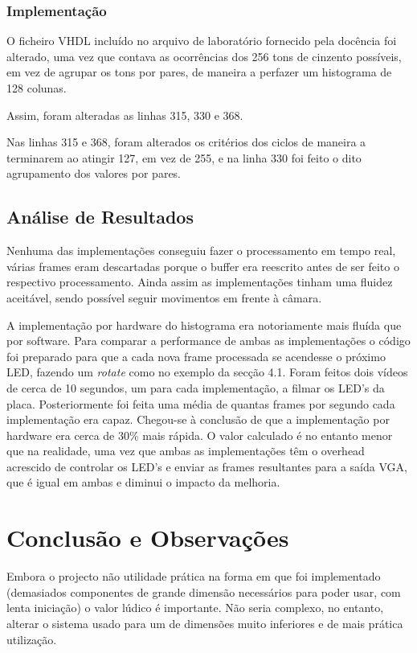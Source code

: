 \documentclass[a4paper,12pt]{article}
\begin{document}


\subsubsection{Implementação}

O ficheiro VHDL incluído no arquivo de laboratório fornecido pela docência foi alterado, uma vez que contava as ocorrências dos 256 tons de cinzento possíveis, em vez de agrupar os tons por pares, de maneira a perfazer um histograma de 128 colunas.

Assim, foram alteradas as linhas 315, 330 e 368.

Nas linhas 315 e 368, foram alterados os critérios dos ciclos de maneira a terminarem ao atingir 127, em vez de 255, e na linha 330 foi feito o dito agrupamento dos valores por pares.



\subsection{Análise de Resultados}
Nenhuma das implementações conseguiu fazer o processamento em tempo real, várias frames eram descartadas porque o buffer era reescrito antes de ser feito o respectivo processamento. Ainda assim as implementações tinham uma fluidez aceitável, sendo possível seguir movimentos em frente à câmara.

A implementação por hardware do histograma era notoriamente mais fluída que por software. Para comparar a performance de ambas as implementações o código foi preparado para que a cada nova frame processada se acendesse o próximo LED, fazendo um \textit{rotate} como no exemplo da secção 4.1. Foram feitos dois vídeos de cerca de 10 segundos, um para cada implementação, a filmar os LED's da placa. Posteriormente foi feita uma média de quantas frames por segundo cada implementação era capaz. Chegou-se à conclusão de que a implementação por hardware era cerca de 30\% mais rápida. O valor calculado é no entanto menor que na realidade, uma vez que ambas as implementações têm o overhead acrescido de controlar os LED's e enviar as frames resultantes para a saída VGA, que é igual em ambas e diminui o impacto da melhoria.

\section{Conclusão e Observações}
Embora o projecto não utilidade prática na forma em que foi implementado (demasiados componentes de grande dimensão necessários para poder usar, com lenta iniciação) o valor lúdico é importante. Não seria complexo, no entanto, alterar o sistema usado para um de dimensões muito inferiores e de mais prática utilização. 
\end{document}
